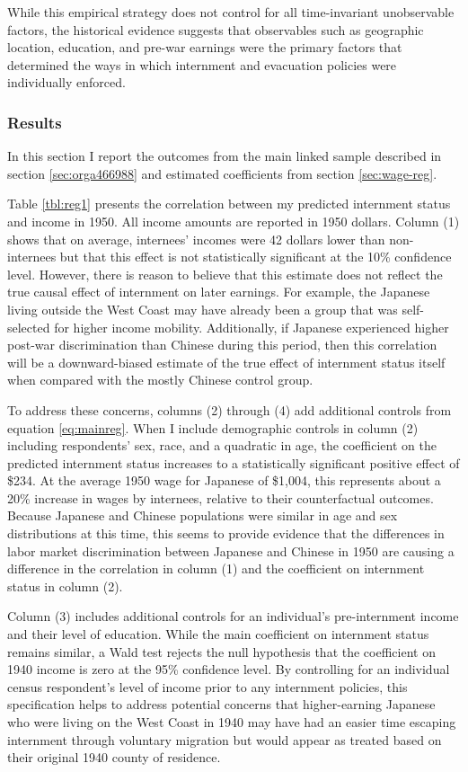 \documentclass[12pt]{article}
\begin{document}
While this empirical strategy does not control
for all time-invariant unobservable factors,
the historical evidence suggests that
observables such as geographic location, education, and pre-war earnings
were the primary factors that determined the ways in which
internment and evacuation policies were individually enforced.
\subsubsection{Results}
\label{sec:orgd71b4da}
In this section I report the outcomes from the main linked sample
described in section \ref{sec:orga466988}
and estimated coefficients from section \ref{sec:wage-reg}.



Table \ref{tbl:reg1} presents the correlation between my predicted internment status and income in 1950.
All income amounts are reported in 1950 dollars.
Column (1) shows that on average, internees' incomes were 42 dollars lower than non-internees
but that this effect is not statistically significant at the 10\% confidence level.
However, there is reason to believe that this estimate does not reflect the true causal effect of internment on later earnings.
For example, the Japanese living outside the West Coast may have already been a group that was self-selected for higher income mobility.
Additionally, if Japanese experienced higher post-war discrimination than Chinese during this period,
then this correlation will be a downward-biased estimate of the true effect of internment status itself when compared with the
mostly Chinese control group.

To address these concerns, columns (2) through (4)
add additional controls from equation \ref{eq:mainreg}.
When I include demographic controls in column (2)
including respondents' sex, race, and a quadratic in age,
the coefficient on the predicted internment status increases
to a statistically significant positive effect of \$234.
At the average 1950 wage for Japanese of \$1,004,
this represents about a 20\% increase in wages by internees,
relative to their counterfactual outcomes.
Because Japanese and Chinese populations were similar in age and sex
distributions at this time,
this seems to provide evidence that the differences in labor market
discrimination between Japanese and Chinese in 1950
are causing a difference in the correlation in column (1)
and the coefficient on internment status in column (2).

Column (3) includes additional controls for an individual's
pre-internment income and their level of education.
While the main coefficient on internment status remains similar,
a Wald test rejects the null hypothesis
that the coefficient on 1940 income is zero
at the 95\% confidence level.
By controlling for an individual census respondent's level of income
prior to any internment policies,
this specification helps to address potential concerns
that higher-earning Japanese who were living on the West Coast in 1940
may have had an easier time escaping internment through voluntary migration
but would appear as treated based on their original 1940 county of residence.
\end{document}
